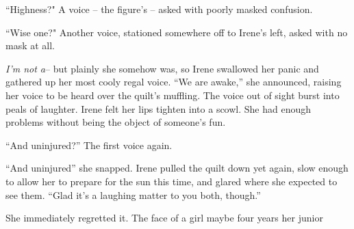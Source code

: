\documentclass[../FGP.tex]{subfiles}
\begin{document}
\begin{fragment}
``Highness?" A voice -- the figure's -- asked with poorly masked confusion.

\reversemarginpar``Wise one?" Another voice, stationed somewhere off to Irene's left, asked with no mask at all.

\emph{I'm not a}-- but plainly she somehow was, so Irene swallowed her panic and gathered up her most cooly regal voice. ``We are awake,'' she announced, raising her voice to be heard over the quilt's muffling. The voice out of sight burst into peals of laughter. Irene felt her lips tighten into a scowl. She had enough problems without being the object of someone's fun.

``And uninjured?'' The first voice again.

``And uninjured'' she snapped. Irene pulled the quilt down yet again, slow enough to allow her to prepare for the sun this time, and glared where she expected to see them. ``Glad it's a laughing matter to you both, though.''

She immediately regretted it. The face of a girl maybe four years her junior 




\end{fragment}
\end{document}
